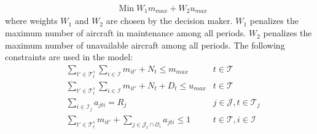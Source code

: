 \documentclass[a4paper,onecolumn,fleqn]{article}
\begin{document}
    \begin{align}
        & \text{Min}\; W_1 m_{max} + W_2 u_{max}
    \end{align}
    where weights $W_1$ and $W_2$ are chosen by the decision maker. $W_1$ penalizes the maximum number of aircraft in maintenance among all periods. $W_2$ penalizes the maximum number of unavailable aircraft among all periods.
    The following constraints are used in the model:       
    \begin{align}
        & \sum_{t' \in \mathcal{T}^{s}_t} \sum_{i \in \mathcal{I}} m_{it'} + N_t \leq m_{max}
          & t \in \mathcal{T} \label{eq:capacity1}\\
       & \sum_{t' \in \mathcal{T}^{s}_t} \sum_{i \in \mathcal{I}} m_{it'} + N_t + D_t\leq u_{max} 
        &t \in \mathcal{T} \label{eq:avalaibility1}\\
        & \sum_{i \in \mathcal{I}_j} a_{jti} = R_j
                & j \in \mathcal{J}, t \in \mathcal{T}_j  \label{eq:taskres}\\
        & \sum_{t' \in \mathcal{T}^{s}_t} m_{it'} + \sum_{j \in \mathcal{J}_t \cap \mathcal{O}_i} a_{jti} \leq 1 
                & t \in \mathcal{T}, i \in \mathcal{I} \label{eq:state}
    \end{align}
\end{document}
